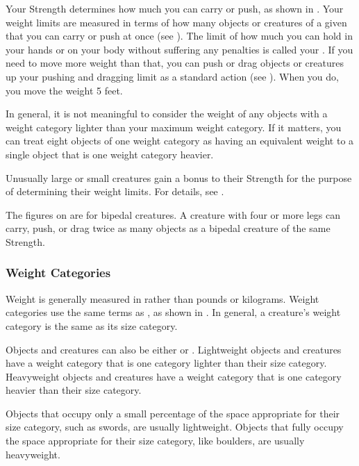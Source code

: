     Your Strength determines how much you can carry or push, as shown in .
    Your weight limits are measured in terms of how many objects or creatures of a given  that you can carry or push at once (see ).
    The limit of how much you can hold in your hands or on your body without suffering any penalties is called your .
    If you need to move more weight than that, you can push or drag objects or creatures up your pushing and dragging limit as a standard action (see ).
    When you do, you move the weight 5 feet.

    In general, it is not meaningful to consider the weight of any objects with a weight category lighter than your maximum weight category.
    If it matters, you can treat eight objects of one weight category as having an equivalent weight to a single object that is one weight category heavier.

     Unusually large or small creatures gain a bonus to their Strength for the purpose of determining their weight limits.
    For details, see .

     The figures on  are for bipedal creatures.
    A creature with four or more legs can carry, push, or drag twice as many objects as a bipedal creature of the same Strength.

    \subsubsection{Weight Categories}\label{Weight Categories}
      Weight is generally measured in  rather than pounds or kilograms.
      Weight categories use the same terms as , as shown in .
      In general, a creature's weight category is the same as its size category.

      Objects and creatures can also be either  or .
      Lightweight objects and creatures have a weight category that is one category lighter than their size category.
      Heavyweight objects and creatures have a weight category that is one category heavier than their size category.

      Objects that occupy only a small percentage of the space appropriate for their size category, such as swords, are usually lightweight.
      Objects that fully occupy the space appropriate for their size category, like boulders, are usually heavyweight.

